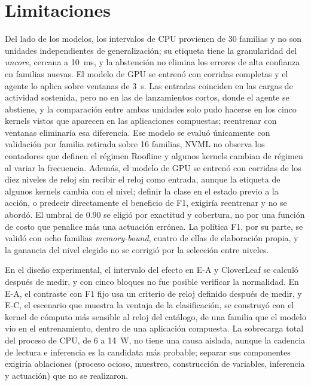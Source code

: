 \section{Limitaciones}

Del lado de los modelos, los intervalos de CPU provienen de 30 familias y no son unidades independientes de generalización; su etiqueta tiene la granularidad del \textit{uncore}, cercana a 10~ms, y la abstención no elimina los errores de alta confianza en familias nuevas. El modelo de GPU se entrenó con corridas completas y el agente lo aplica sobre ventanas de 3~s. Las entradas coinciden en las cargas de actividad sostenida, pero no en las de lanzamientos cortos, donde el agente se abstiene, y la comparación entre ambas unidades solo pudo hacerse en los cinco kernels vistos que aparecen en las aplicaciones compuestas; reentrenar con ventanas eliminaría esa diferencia. Ese modelo se evaluó únicamente con validación por familia retirada sobre 16 familias, NVML no observa los contadores que definen el régimen Roofline y algunos kernels cambian de régimen al variar la frecuencia. Además, el modelo de GPU se entrenó con corridas de los diez niveles de reloj sin recibir el reloj como entrada, aunque la etiqueta de algunos kernels cambia con el nivel; definir la clase en el estado previo a la acción, o predecir directamente el beneficio de F1, exigiría reentrenar y no se abordó. El umbral de 0.90 se eligió por exactitud y cobertura, no por una función de costo que penalice más una actuación errónea. La política F1, por su parte, se validó con ocho familias \textit{memory-bound}, cuatro de ellas de elaboración propia, y la ganancia del nivel elegido no se corrigió por la selección entre niveles.

En el diseño experimental, el intervalo del efecto en E-A y CloverLeaf se calculó después de medir, y con cinco bloques no fue posible verificar la normalidad. En E-A, el contraste con F1 fijo usa un criterio de reloj definido después de medir, y E-C, el escenario que muestra la ventaja de la clasificación, se construyó con el kernel de cómputo más sensible al reloj del catálogo, de una familia que el modelo vio en el entrenamiento, dentro de una aplicación compuesta. La sobrecarga total del proceso de CPU, de 6 a 14~W, no tiene una causa aislada, aunque la cadencia de lectura e inferencia es la candidata más probable; separar sus componentes exigiría ablaciones (proceso ocioso, muestreo, construcción de variables, inferencia y actuación) que no se realizaron.

